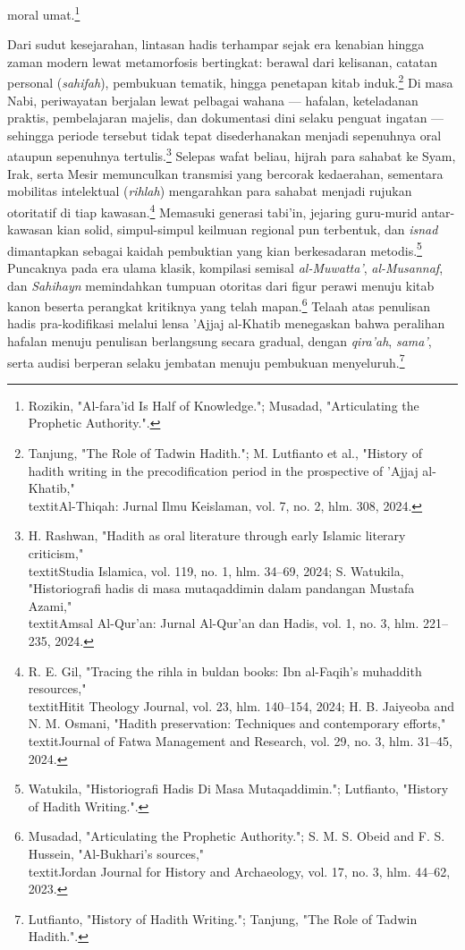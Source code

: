 moral umat.\footnote{Rozikin, "Al-fara'id Is Half of Knowledge."; Musadad, "Articulating the Prophetic Authority.".}

Dari sudut kesejarahan, lintasan hadis terhampar sejak era kenabian hingga zaman modern lewat metamorfosis bertingkat: berawal dari kelisanan, catatan personal (\textit{sahifah}), pembukuan tematik, hingga penetapan kitab induk.\footnote{Tanjung, "The Role of Tadwin Hadith."; M. Lutfianto et al., "History of hadith writing in the precodification period in the prospective of 'Ajjaj al-Khatib," \\textit{Al-Thiqah: Jurnal Ilmu Keislaman}, vol. 7, no. 2, hlm. 308, 2024.} Di masa Nabi, periwayatan berjalan lewat pelbagai wahana --- hafalan, keteladanan praktis, pembelajaran majelis, dan dokumentasi dini selaku penguat ingatan --- sehingga periode tersebut tidak tepat disederhanakan menjadi sepenuhnya oral ataupun sepenuhnya tertulis.\footnote{H. Rashwan, "Hadith as oral literature through early Islamic literary criticism," \\textit{Studia Islamica}, vol. 119, no. 1, hlm. 34--69, 2024; S. Watukila, "Historiografi hadis di masa mutaqaddimin dalam pandangan Mustafa Azami," \\textit{Amsal Al-Qur'an: Jurnal Al-Qur'an dan Hadis}, vol. 1, no. 3, hlm. 221--235, 2024.} Selepas wafat beliau, hijrah para sahabat ke Syam, Irak, serta Mesir memunculkan transmisi yang bercorak kedaerahan, sementara mobilitas intelektual (\textit{rihlah}) mengarahkan para sahabat menjadi rujukan otoritatif di tiap kawasan.\footnote{R. E. Gil, "Tracing the rihla in buldan books: Ibn al-Faqih's muhaddith resources," \\textit{Hitit Theology Journal}, vol. 23, hlm. 140--154, 2024; H. B. Jaiyeoba and N. M. Osmani, "Hadith preservation: Techniques and contemporary efforts," \\textit{Journal of Fatwa Management and Research}, vol. 29, no. 3, hlm. 31--45, 2024.} Memasuki generasi tabi'in, jejaring guru-murid antar-kawasan kian solid, simpul-simpul keilmuan regional pun terbentuk, dan \textit{isnad} dimantapkan sebagai kaidah pembuktian yang kian berkesadaran metodis.\footnote{Watukila, "Historiografi Hadis Di Masa Mutaqaddimin."; Lutfianto, "History of Hadith Writing.".} Puncaknya pada era ulama klasik, kompilasi semisal \textit{al-Muwatta'}, \textit{al-Musannaf}, dan \textit{Sahihayn} memindahkan tumpuan otoritas dari figur perawi menuju kitab kanon beserta perangkat kritiknya yang telah mapan.\footnote{Musadad, "Articulating the Prophetic Authority."; S. M. S. Obeid and F. S. Hussein, "Al-Bukhari's sources," \\textit{Jordan Journal for History and Archaeology}, vol. 17, no. 3, hlm. 44--62, 2023.} Telaah atas penulisan hadis pra-kodifikasi melalui lensa 'Ajjaj al-Khatib menegaskan bahwa peralihan hafalan menuju penulisan berlangsung secara gradual, dengan \textit{qira'ah}, \textit{sama'}, serta audisi berperan selaku jembatan menuju pembukuan menyeluruh.\footnote{Lutfianto, "History of Hadith Writing."; Tanjung, "The Role of Tadwin Hadith.".}

